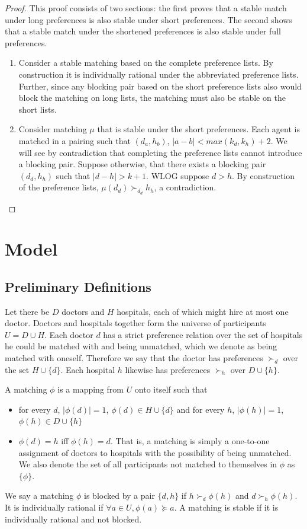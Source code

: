 \documentclass[WP]{AEA}
\begin{document}
\begin{proof}
	
	This proof consists of two sections: the first proves that a stable match under long preferences is also stable under short preferences.  The second shows that a stable match under the shortened preferences is also stable under full preferences.
	\begin{enumerate}
		
		\item Consider a stable matching based on the complete preference lists. By construction it is individually rational under the abbreviated preference lists.  Further, since any blocking pair based on the short preference lists also would block the matching on long lists, the matching must also be stable on the short lists.
		
		\item Consider matching $\mu$ that is stable under the short preferences. Each agent is matched in a pairing such that  $(d_a,h_b)$, $|a-b| < max(k_d,k_h)+2$. We will see by contradiction that completing the preference lists cannot introduce a blocking pair.
		Suppose otherwise, that there exists a blocking pair $(d_{d},h_{h})$ such that  $|d-h| > k+1$. WLOG suppose $d > h$. By construction of the preference lists, $\mu(d_{d}) \succ_{d_{d}} h_{h}$, a contradiction.
	\end{enumerate} 

\end{proof}
\section{Model}
\subsection{Preliminary Definitions}

Let there be $D$ doctors and $H$ hospitals, each of which might hire at most one doctor. Doctors and hospitals together form the universe of participants $U = D \cup H$.  Each doctor $d$ has a strict preference relation over the set of hospitals he could be matched with and being unmatched, which we denote as being matched with oneself. Therefore we say that the doctor has preferences $\succ_{d}$ over the set $H \cup \{d\}$. Each hospital $h$ likewise has preferences $\succ_h$ over $D \cup \{h\}$. 

A matching $\phi$ is a mapping from $U$ onto itself such that 
\begin{itemize}
	\item for every $d$, $|\phi(d)| = 1$, $\phi(d) \in H \cup \{d\} $ and for every  $h$, $|\phi(h)| = 1$, $\phi(h) \in D \cup \{h\}$
	\item $\phi(d) = h$ iff $\phi(h) = d$.  That is, a matching is simply a one-to-one assignment of doctors to hospitals with the possibility of being unmatched. We also denote the set of all participants not matched to themselves in $\phi$ as $\{\phi\}$.
\end{itemize}
We say a matching $\phi$ is blocked by a pair $\{d,h\}$ if $h \succ_d \phi(h)$ and $d \succ_h \phi(h)$. It is individually rational if $\forall a \in U ,\phi(a) \succeq a$. A matching is stable if it is individually rational and not blocked.
\end{document}
